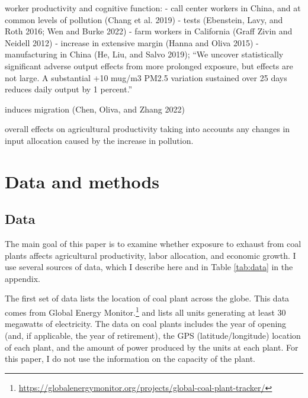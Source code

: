 \documentclass[
]{article}
\begin{document}
worker productivity and cognitive function:
- call center workers in China, and at common levels of pollution (Chang et al. 2019)
- tests (Ebenstein, Lavy, and Roth 2016; Wen and Burke 2022)
- farm workers in California (Graff Zivin and Neidell 2012)
- increase in extensive margin (Hanna and Oliva 2015)
- manufacturing in China (He, Liu, and Salvo 2019); ``We uncover statistically significant adverse output effects from more prolonged exposure, but effects are not large. A substantial +10 mug/m3 PM2.5 variation sustained over 25 days reduces daily output by 1 percent.''

induces migration (Chen, Oliva, and Zhang 2022)

overall effects on agricultural productivity taking into accounts any changes in input allocation caused by the increase in pollution.

\hypertarget{data-and-methods}{%
\section{Data and methods}\label{data-and-methods}}

\hypertarget{data}{%
\subsection{Data}\label{data}}

The main goal of this paper is to examine whether exposure to exhaust from coal plants affects agricultural productivity, labor allocation, and economic growth. I use several sources of data, which I describe here and in Table \ref{tab:data} in the appendix.

The first set of data lists the location of coal plant across the globe. This data comes from Global Energy Monitor.\footnote{\url{https://globalenergymonitor.org/projects/global-coal-plant-tracker/}} and lists all units generating at least 30 megawatts of electricity. The data on coal plants includes the year of opening (and, if applicable, the year of retirement), the GPS (latitude/longitude) location of each plant, and the amount of power produced by the units at each plant. For this paper, I do not use the information on the capacity of the plant.
\end{document}
